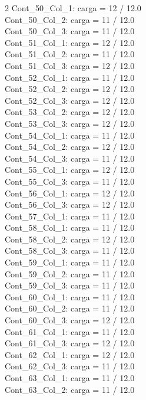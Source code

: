 \begin{multicols}{2}
Cont\_50\_Col\_1: carga = 12 / 12.0\\
Cont\_50\_Col\_2: carga = 11 / 12.0\\
Cont\_50\_Col\_3: carga = 11 / 12.0\\
Cont\_51\_Col\_1: carga = 12 / 12.0\\
Cont\_51\_Col\_2: carga = 11 / 12.0\\
Cont\_51\_Col\_3: carga = 12 / 12.0\\
Cont\_52\_Col\_1: carga = 11 / 12.0\\
Cont\_52\_Col\_2: carga = 12 / 12.0\\
Cont\_52\_Col\_3: carga = 12 / 12.0\\
Cont\_53\_Col\_2: carga = 12 / 12.0\\
Cont\_53\_Col\_3: carga = 12 / 12.0\\
Cont\_54\_Col\_1: carga = 11 / 12.0\\
Cont\_54\_Col\_2: carga = 12 / 12.0\\
Cont\_54\_Col\_3: carga = 11 / 12.0\\
Cont\_55\_Col\_1: carga = 12 / 12.0\\
Cont\_55\_Col\_3: carga = 11 / 12.0\\
Cont\_56\_Col\_1: carga = 12 / 12.0\\
Cont\_56\_Col\_3: carga = 12 / 12.0\\
Cont\_57\_Col\_1: carga = 11 / 12.0\\
Cont\_58\_Col\_1: carga = 11 / 12.0\\
Cont\_58\_Col\_2: carga = 12 / 12.0\\
Cont\_58\_Col\_3: carga = 11 / 12.0\\
Cont\_59\_Col\_1: carga = 11 / 12.0\\
Cont\_59\_Col\_2: carga = 11 / 12.0\\
Cont\_59\_Col\_3: carga = 11 / 12.0\\
Cont\_60\_Col\_1: carga = 11 / 12.0\\
Cont\_60\_Col\_2: carga = 11 / 12.0\\
Cont\_60\_Col\_3: carga = 12 / 12.0\\
Cont\_61\_Col\_1: carga = 11 / 12.0\\
Cont\_61\_Col\_3: carga = 12 / 12.0\\
Cont\_62\_Col\_1: carga = 12 / 12.0\\
Cont\_62\_Col\_3: carga = 11 / 12.0\\
Cont\_63\_Col\_1: carga = 11 / 12.0\\
Cont\_63\_Col\_2: carga = 11 / 12.0\\

\end{multicols}
